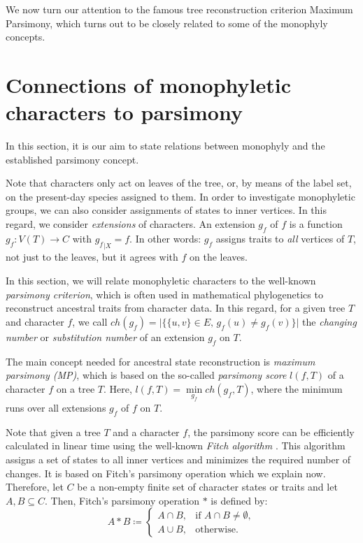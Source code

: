\documentclass{amsart}
\theoremstyle{definition}
\begin{document}
We now turn our attention to the famous tree reconstruction criterion Maximum Parsimony, which turns out to be closely related to some of the monophyly concepts. 

\section{Connections of monophyletic characters to parsimony}\label{s:pars}

In this section, it is our aim to state relations between monophyly and the established parsimony concept. 

Note that characters only act on leaves of the tree, or, by means of the label set, on the present-day species assigned to them. In order to investigate monophyletic groups, we can also consider assignments of states to inner vertices. In this regard, we consider \emph{extensions} of characters. An extension $g_f$ of $f$ is a function $g_f:V(T)\rightarrow C$ with ${g_f}_{\vert X}=f$. In other words: $g_f$ assigns traits to \emph{all} vertices of $T$, not just to the leaves, but it agrees with $f$ on the leaves.

In this section, we will relate monophyletic characters to the well-known \emph{parsimony criterion}, which is often used in mathematical phylogenetics to reconstruct ancestral traits from character data. In this regard, for a given tree $T$ and character $f$, we call $ch(g_f) = \vert \{ \{u,v\} \in E, \, g_f(u) \neq g_f(v)\} \vert$ the \emph{changing number} or \emph{substitution number} of an extension $g_f$ on $T$.

The main concept needed for ancestral state reconstruction is \emph{maximum parsimony (MP)}, which is based on the so-called \emph{parsimony score} $l(f,T)$ of a character $f$ on a tree $T$. Here, $l(f,T) = \min\limits_{g_f} ch(g_f,T)$, where the minimum runs over all extensions $g_f$ of $f$ on $T$. 

Note that given a tree $T$ and a character $f$, the parsimony score can be efficiently calculated in linear time using the well-known \emph{Fitch algorithm} \cite{Fitch,Hartigan1973}.
This algorithm assigns a set of states to all inner vertices and minimizes the required number of changes. It is based on Fitch's parsimony operation which we explain now. Therefore, let $C$ be a non-empty finite set of character states or traits and let $A,B \subseteq C$. Then, Fitch's parsimony operation $*$ is defined by:
$$A*B \coloneqq \begin{cases}
A \cap B, & \text{if } A \cap B \neq \emptyset, \\
A \cup B, & \text{otherwise.}
\end{cases}$$
\end{document}
